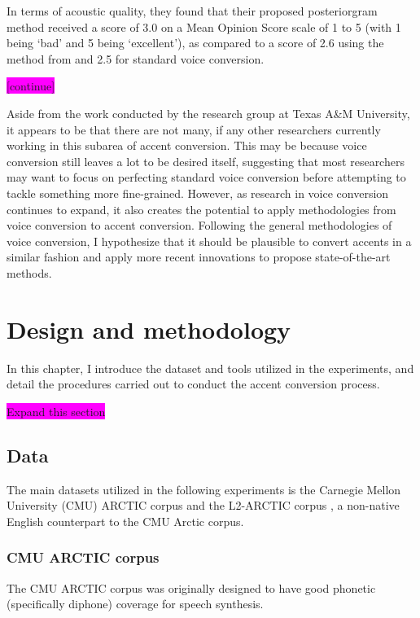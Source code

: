 \documentclass
[
    a4paper,
    twoside,
    12pt,
]
{report}
\begin{document}
In terms of acoustic quality, they found that their proposed
posteriorgram method received a score of 3.0 on a Mean Opinion Score
scale of 1 to 5 (with 1 being `bad' and 5 being `excellent'), as
compared to a score of 2.6 using the method from \textcite{aryal2014}
and 2.5 for standard voice conversion.

\colorbox{magenta}{[continue]}

Aside from the work conducted by the research group at Texas A\&M
University, it appears to be that there are not many, if any other
researchers currently working in this subarea of accent conversion. This
may be because voice conversion still leaves a lot to be desired itself,
suggesting that most researchers may want to focus on perfecting
standard voice conversion before attempting to tackle something more
fine-grained. However, as research in voice conversion continues to
expand, it also creates the potential to apply methodologies from voice
conversion to accent conversion. Following the general methodologies of
voice conversion, I hypothesize that it should be plausible to convert
accents in a similar fashion and apply more recent innovations to
propose state-of-the-art methods.
\cleardoublepage
\chapter{Design and methodology}

In this chapter, I introduce the dataset and tools utilized in the
experiments, and detail the procedures carried out to conduct the accent
conversion process.

\colorbox{magenta}{Expand this section}

\hypertarget{data}{%
\section{Data}\label{data}}

The main datasets utilized in the following experiments is the Carnegie
Mellon University (CMU) ARCTIC corpus \parencite{kominek2004} and the
L2-ARCTIC corpus \parencite{zhao2018}, a non-native English counterpart
to the CMU Arctic corpus.

\hypertarget{cmu-arctic-corpus}{%
\subsection{CMU ARCTIC corpus}\label{cmu-arctic-corpus}}

The CMU ARCTIC corpus was originally designed to have good phonetic
(specifically diphone) coverage for speech synthesis.
\end{document}
